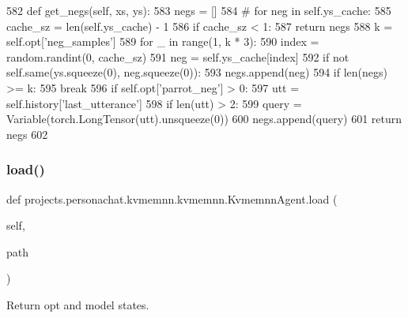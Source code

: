 \begin{DoxyCode}
582     \textcolor{keyword}{def }get\_negs(self, xs, ys):
583         negs = []
584         \textcolor{comment}{# for neg in self.ys\_cache:}
585         cache\_sz = len(self.ys\_cache) - 1
586         \textcolor{keywordflow}{if} cache\_sz < 1:
587             \textcolor{keywordflow}{return} negs
588         k = self.opt[\textcolor{stringliteral}{'neg\_samples'}]
589         \textcolor{keywordflow}{for} \_ \textcolor{keywordflow}{in} range(1, k * 3):
590             index = random.randint(0, cache\_sz)
591             neg = self.ys\_cache[index]
592             \textcolor{keywordflow}{if} \textcolor{keywordflow}{not} self.same(ys.squeeze(0), neg.squeeze(0)):
593                 negs.append(neg)
594                 \textcolor{keywordflow}{if} len(negs) >= k:
595                     \textcolor{keywordflow}{break}
596         \textcolor{keywordflow}{if} self.opt[\textcolor{stringliteral}{'parrot\_neg'}] > 0:
597             utt = self.history[\textcolor{stringliteral}{'last\_utterance'}]
598             \textcolor{keywordflow}{if} len(utt) > 2:
599                 query = Variable(torch.LongTensor(utt).unsqueeze(0))
600                 negs.append(query)
601         \textcolor{keywordflow}{return} negs
602 
\end{DoxyCode}
\mbox{\label{classprojects_1_1personachat_1_1kvmemnn_1_1kvmemnn_1_1KvmemnnAgent_a925938f3ecf2972ba0d35f0a915afdaf}} 
\subsubsection{\texorpdfstring{load()}{load()}}
{\footnotesize\ttfamily def projects.\+personachat.\+kvmemnn.\+kvmemnn.\+Kvmemnn\+Agent.\+load (\begin{DoxyParamCaption}\item[{}]{self,  }\item[{}]{path }\end{DoxyParamCaption})}

\begin{DoxyVerb}Return opt and model states.
\end{DoxyVerb}
 

